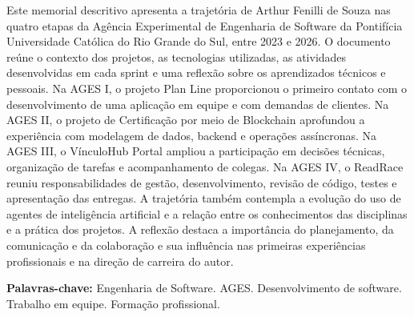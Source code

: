 \begin{resumo}
Este memorial descritivo apresenta a trajetória de Arthur Fenilli de Souza nas quatro etapas da Agência Experimental de Engenharia de Software da Pontifícia Universidade Católica do Rio Grande do Sul, entre 2023 e 2026. O documento reúne o contexto dos projetos, as tecnologias utilizadas, as atividades desenvolvidas em cada sprint e uma reflexão sobre os aprendizados técnicos e pessoais. Na AGES I, o projeto Plan Line proporcionou o primeiro contato com o desenvolvimento de uma aplicação em equipe e com demandas de clientes. Na AGES II, o projeto de Certificação por meio de Blockchain aprofundou a experiência com modelagem de dados, backend e operações assíncronas. Na AGES III, o VínculoHub Portal ampliou a participação em decisões técnicas, organização de tarefas e acompanhamento de colegas. Na AGES IV, o ReadRace reuniu responsabilidades de gestão, desenvolvimento, revisão de código, testes e apresentação das entregas. A trajetória também contempla a evolução do uso de agentes de inteligência artificial e a relação entre os conhecimentos das disciplinas e a prática dos projetos. A reflexão destaca a importância do planejamento, da comunicação e da colaboração e sua influência nas primeiras experiências profissionais e na direção de carreira do autor.

\vspace{\onelineskip}
\noindent\textbf{Palavras-chave:} Engenharia de Software. AGES. Desenvolvimento de software. Trabalho em equipe. Formação profissional.
\end{resumo}
